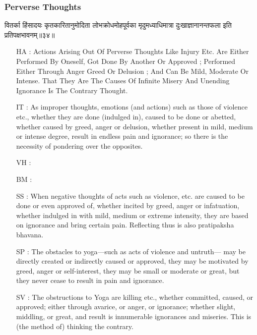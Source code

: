 \begin{frame}[fragile]\frametitle{Perverse Thoughts}
\begin{sanskrit}
वितर्का हिंसादयः कृतकारितानुमोदिता लोभक्रोधमोहपूर्वका मृदुमध्याधिमात्रा दुःखाज्ञानानन्तफला इति प्रतिपक्षभावनम्॥३४॥
\end{sanskrit}

	\begin{itemize}
	\item [HA]: Actions Arising Out Of Perverse Thoughts Like Injury Etc. Are Either Performed By Oneself, Got Done By Another Or Approved ; Performed Either Through Anger Greed Or Delusion ; And Can Be Mild, Moderate Or Intense. That They Are The Causes Of Infinite Misery And Unending Ignorance Is The Contrary Thought.
	\item [IT]: As improper thoughts, emotions (and actions) such as those of violence etc., whether they are done (indulged in), caused to be done or abetted, whether caused by greed, anger or delusion, whether present in mild, medium or intense degree, result in endless pain and ignorance; so there is the necessity of pondering over the opposites.
	\item [VH]: 
	\item [BM]: 
	\item [SS]: When negative thoughts of acts such as violence, etc. are caused to be done or even approved of, whether incited by greed, anger or infatuation, whether indulged in with mild, medium or extreme intensity, they are based on ignorance and bring certain pain. Reflecting thus is also pratipaksha bhavana.
	\item [SP]: The obstacles to yoga—such as acts of violence and untruth— may be directly created or indirectly caused or approved, they may be motivated by greed, anger or self-interest, they may be small or moderate or great, but they never cease to result in pain and ignorance.
	\item [SV]: The obstructions to Yoga are killing etc., whether committed, caused, or approved; either through avarice, or anger, or ignorance; whether slight, middling, or great, and result is innumerable ignorances and miseries. This is (the method of) thinking the contrary. 
	\end{itemize}
\end{frame}

